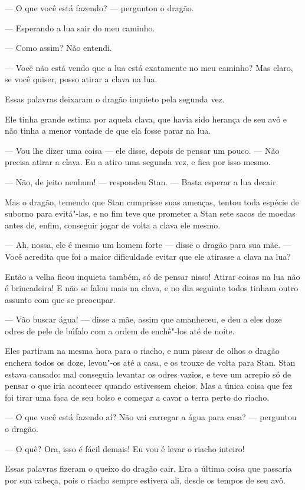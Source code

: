 --- O que você está fazendo? --- perguntou o dragão.

--- Esperando a lua sair do meu caminho.

--- Como assim? Não entendi.

--- Você não está vendo que a lua está exatamente no meu caminho? Mas
claro, se você quiser, posso atirar a clava na lua.

Essas palavras deixaram o dragão inquieto pela segunda vez.

Ele tinha grande estima por aquela clava, que havia sido herança de
seu avô e não tinha a menor vontade de que ela fosse parar na lua.

--- Vou lhe dizer uma coisa --- ele disse, depois de pensar um pouco. ---
Não precisa atirar a clava. Eu a atiro uma segunda vez, e fica por
isso mesmo.

--- Não, de jeito nenhum! --- respondeu Stan. --- Basta esperar a lua decair.

Mas o dragão, temendo que Stan cumprisse suas ameaças, tentou toda
espécie de suborno para evitá"-las, e no fim teve que prometer a Stan
sete sacos de moedas antes de, enfim, conseguir jogar de volta a clava
ele mesmo.

--- Ah, nossa, ele é mesmo um homem forte --- disse o dragão para sua mãe.
--- Você acredita que foi a maior dificuldade evitar que ele atirasse a
clava na lua? 

Então a velha ficou inquieta também, só de pensar nisso! Atirar coisas
na lua não é brincadeira! E não se falou mais na clava, e no dia
seguinte todos tinham outro assunto com que se preocupar.

--- Vão buscar água! --- disse a mãe, assim que amanheceu, e deu a eles
doze odres de pele de búfalo com a ordem de enchê"-los até de noite.

Eles partiram na mesma hora para o riacho, e num piscar de olhos o
dragão enchera todos os doze, levou"-os até a casa, e os trouxe de
volta para Stan. Stan estava cansado: mal conseguia levantar os odres
vazios, e teve um arrepio só de pensar o que iria acontecer quando
estivessem cheios. Mas a única coisa que fez foi tirar uma faca de
seu bolso e começar a cavar a terra perto do riacho.

--- O que você está fazendo aí? Não vai carregar a água para casa? ---
perguntou o dragão.

--- O quê? Ora, isso é fácil demais! Eu vou é levar o riacho inteiro!

Essas palavras fizeram o queixo do dragão cair. Era a última coisa que
passaria por sua cabeça, pois o riacho sempre estivera ali, desde os
tempos de seu avô.

